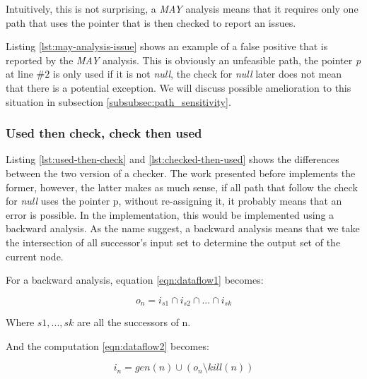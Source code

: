 Intuitively, this is not surprising, a \emph{MAY} analysis means that it requires only one path that uses the pointer that is then checked to report an issues. 



Listing \ref{lst:may-analysis-issue} shows an example of a false positive that is reported by the \emph{MAY} analysis. 
This is obviously an unfeasible path, the pointer \emph{p} at line $\#2$ is only used if it is not \emph{null}, the check for \emph{null} later does not mean that there is a potential exception.
We will discuss possible amelioration to this situation in subsection \ref{subsubsec:path_sensitivity}.

\subsubsection{Used then check, check then used}
\label{subsubsec:used_then_check_check_then_used}




Listing \ref{lst:used-then-check} and \ref{lst:checked-then-used} shows the differences between the two version of a checker.
The work presented before implements the former, however, the latter makes as much sense, if all path that follow the check for \emph{null} uses the pointer p, without re-assigning it, it probably means that an error is possible.
In the implementation, this would be implemented using a backward analysis. 
As the name suggest, a backward analysis means that we take the intersection of all successor’s input set to determine the output set of the current node. 

For a backward analysis, equation \ref{eqn:dataflow1} becomes:

\begin{equation}\label{eqn:checkthenused1}
o_{n} = i_{s1}  \cap   i_{s2}  \cap  ... \cap   i_{sk}
\end{equation}

Where $s1, ..., sk$ are all the successors of n.

And the computation \ref{eqn:dataflow2} becomes:

\begin{equation}\label{eqn:checkthenused2}
i_{n} = gen(n)  \cup   (o_{n} \setminus kill(n))
\end{equation}

